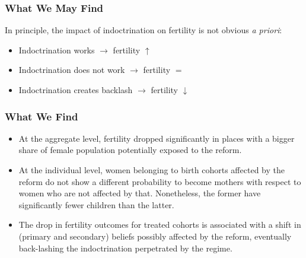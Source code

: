 \documentclass[aspectratio=169]{beamer}
\begin{document}

\begin{frame}
\frametitle{What We May Find}

In principle, the impact of indoctrination on fertility is not obvious \textit{a priori}:
\medskip
\begin{itemize}
    \item Indoctrination works $\rightarrow$ fertility $\uparrow$
    \medskip
    
    \item Indoctrination does not work $\rightarrow$ fertility $=$
    \medskip
    
    \item Indoctrination creates backlash $\rightarrow$ fertility $\downarrow$
    \medskip
    
\end{itemize}
\end{frame} 


\begin{frame}
\frametitle{What We Find}
\begin{itemize}
    \item At the aggregate level, fertility dropped significantly in places with a bigger share of female population potentially exposed to the reform.
\medskip
 \item At the individual level,   women belonging to birth cohorts affected by the reform do not show a different probability to become mothers with respect to women who are not affected by that. Nonetheless, the former have significantly fewer children than the latter.
\medskip
    \item The drop in fertility outcomes for treated cohorts is associated with a shift in (primary and secondary) beliefs possibly affected by the reform, eventually back-lashing the indoctrination perpetrated by the regime.

\end{itemize}


\end{frame} 
\end{document}
